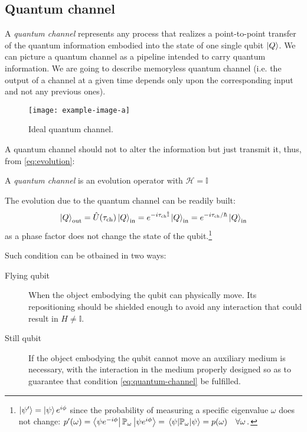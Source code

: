 \subsection{Quantum channel}
A \emph{quantum channel} represents any process that realizes a point-to-point transfer of the quantum information embodied into the state of one single qubit $\ket{Q}$. We can picture a quantum channel as a pipeline intended to carry quantum information. We are going to describe memoryless quantum channel (i.e. the output of a channel at a given time depends only upon the corresponding input and not any previous ones).
\begin{figure}
\centering
\texttt{[image: example-image-a]}
\caption{Ideal quantum channel.}
\label{fig:quantum-channel}
\end{figure}
A quantum channel should not to alter the information but just transmit it, thus, from \eqref{eq:evolution}:
\begin{defn}
A \emph{quantum channel} is an evolution operator with $\mathcal{H}=\mathbb{I}$
\end{defn}
The evolution due to the quantum channel can be readily built:
\begin{equation}\label{eq:quantum-channel}
    \ket{Q}_\textup{out} = \hat{U}(\tau_\textup{ch}) \ket{Q}_\textup{in} = e^{-i\tau_\textup{ch}\hat{\mathbb{I}}} \ket{Q}_\textup{in} = e^{-i\tau_\textup{ch}/\hbar} \ket{Q}_\textup{in}
\end{equation}
as a phase factor does not change the state of the qubit.\footnote{$\ket{\psi'}= \ket{\psi}e^{i\phi}$ since the probability of measuring a specific eigenvalue $\omega$ does not change: $p'(\omega) = \bra{\psi e^{-i\phi}}\mathbb{P}_\omega\ket{\psi e^{i\phi}} = \expval{\mathbb{P}_\omega}{\psi} = p(\omega) \quad \forall \omega\,.$}

Such condition can be otbained in two ways:
\begin{description}
\item[Flying qubit] When the object embodying the qubit can physically move. Its repositioning should be shielded enough to avoid any interaction that could result in $H \neq \mathbb{I}$.
\item[Still qubit] If the object embodying the qubit cannot move an auxiliary medium is necessary, with the interaction in the medium properly designed so as to guarantee that condition \eqref{eq:quantum-channel} be fulfilled.
\end{description}

